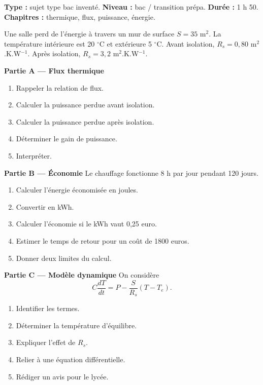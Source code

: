 \documentclass[11pt,a4paper]{article}
\begin{document}
\hypertarget{PC-LONG-06}{}
\begin{sujettype}
\textbf{Type :} sujet type bac inventé.  
\textbf{Niveau :} bac / transition prépa.  
\textbf{Durée :} 1 h 50.  
\textbf{Chapitres :} thermique, flux, puissance, énergie.

Une salle perd de l'énergie à travers un mur de surface $S=35$ m$^2$. La température intérieure est 20 $^\circ$C et extérieure 5 $^\circ$C. Avant isolation, $R_s=0{,}80$ m$^2$.K.W$^{-1}$. Après isolation, $R_s=3{,}2$ m$^2$.K.W$^{-1}$.

\textbf{Partie A — Flux thermique}
\begin{enumerate}
  \item Rappeler la relation de flux.
  \item Calculer la puissance perdue avant isolation.
  \item Calculer la puissance perdue après isolation.
  \item Déterminer le gain de puissance.
  \item Interpréter.
\end{enumerate}

\textbf{Partie B — Économie}
Le chauffage fonctionne 8 h par jour pendant 120 jours.
\begin{enumerate}
  \item Calculer l'énergie économisée en joules.
  \item Convertir en kWh.
  \item Calculer l'économie si le kWh vaut 0,25 euro.
  \item Estimer le temps de retour pour un coût de 1800 euros.
  \item Donner deux limites du calcul.
\end{enumerate}

\textbf{Partie C — Modèle dynamique}
On considère
\[
C\frac{dT}{dt}=P-\frac{S}{R_s}(T-T_e).
\]
\begin{enumerate}
  \item Identifier les termes.
  \item Déterminer la température d'équilibre.
  \item Expliquer l'effet de $R_s$.
  \item Relier à une équation différentielle.
  \item Rédiger un avis pour le lycée.
\end{enumerate}
\end{sujettype}
\end{document}
